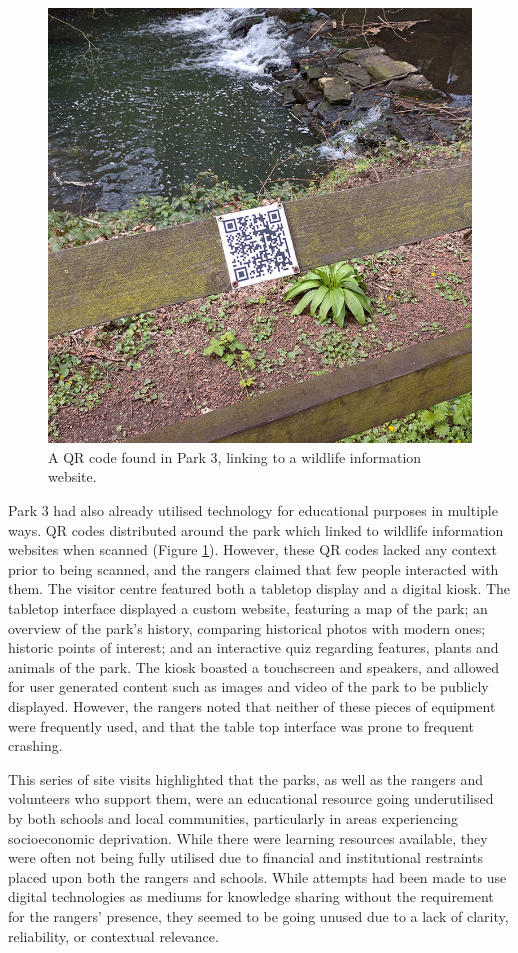 \begin{figure}
  \centering
  \includegraphics[width=0.5\columnwidth]{images/chapter04/jesmondQR.jpg}
  \caption[An existing QR code in Park 3]{A QR code found in Park 3, linking to a wildlife information website.}
  \label{fig:jesmondQR}
\end{figure}

Park 3 had also already utilised technology for educational purposes in multiple ways. QR codes distributed around the park which linked to wildlife information websites when scanned (Figure \ref{fig:jesmondQR}). However, these QR codes lacked any context prior to being scanned, and the rangers claimed that few people interacted with them. The visitor centre featured both a tabletop display and a digital kiosk. The tabletop interface displayed a custom website, featuring a map of the park; an overview of the park's history, comparing historical photos with modern ones; historic points of interest; and an interactive quiz regarding features, plants and animals of the park. The kiosk boasted a touchscreen and speakers, and allowed for user generated content such as images and video of the park to be publicly displayed. However, the rangers noted that neither of these pieces of equipment were frequently used, and that the table top interface was prone to frequent crashing.

This series of site visits highlighted that the parks, as well as the rangers and volunteers who support them, were an educational resource going underutilised by both schools and local communities, particularly in areas experiencing socioeconomic deprivation. While there were learning resources available, they were often not being fully utilised due to financial and institutional restraints placed upon both the rangers and schools. While attempts had been made to use digital technologies as mediums for knowledge sharing without the requirement for the rangers' presence, they seemed to be going unused due to a lack of clarity, reliability, or contextual relevance.

